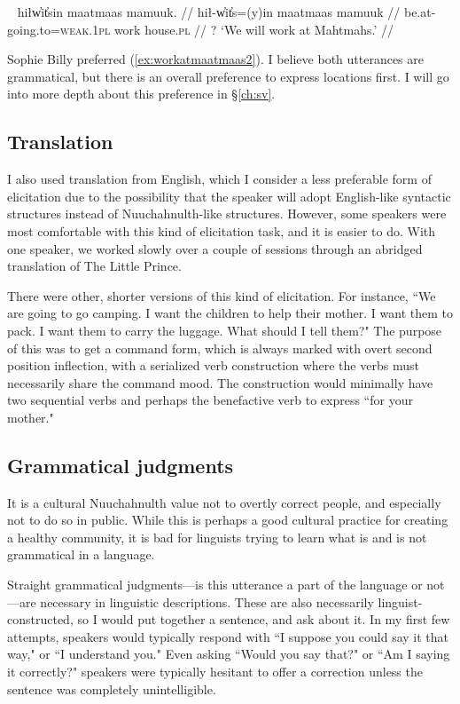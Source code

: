 \ex~ \label{ex:workatmaatmaas2}
\begingl
\glpreamble hiłw̓it̓sin maatmaas mamuuk. //
\gla hił-w̓it̓s=(y)in maatmaas mamuuk //
\glb be.at-going.to=\textsc{weak.1pl} work house.\textsc{pl} //
\glft ? `We will work at Mahtmahs.' //
\endgl
\xe

Sophie Billy preferred (\ref{ex:workatmaatmaas2}). I believe both utterances are grammatical, but there is an overall preference to express locations first. I will go into more depth about this preference in \S\ref{ch:sv}.

\subsection{Translation}

I also used translation from English, which I consider a less preferable form of elicitation due to the possibility that the speaker will adopt English-like syntactic structures instead of Nuuchahnulth-like structures. However, some speakers were most comfortable with this kind of elicitation task, and it is easier to do. With one speaker, we worked slowly over a couple of sessions through an abridged translation of The Little Prince.

There were other, shorter versions of this kind of elicitation. For instance, ``We are going to go camping. I want the children to help their mother. I want them to pack. I want them to carry the luggage. What should I tell them?" The purpose of this was to get a command form, which is always marked with overt second position inflection, with a serialized verb construction where the verbs must necessarily share the command mood. The construction would minimally have two sequential verbs and perhaps the benefactive verb to express ``for your mother."

\subsection{Grammatical judgments}

It is a cultural Nuuchahnulth value not to overtly correct people, and especially not to do so in public. While this is perhaps a good cultural practice for creating a healthy community, it is bad for linguists trying to learn what is and is not grammatical in a language.

Straight grammatical judgments---is this utterance a part of the language or not---are necessary in linguistic descriptions. These are also necessarily linguist-constructed, so I would put together a sentence, and ask about it. In my first few attempts, speakers would typically respond with ``I suppose you could say it that way," or ``I understand you." Even asking ``Would you say that?" or ``Am I saying it correctly?" speakers were typically hesitant to offer a correction unless the sentence was completely unintelligible.

